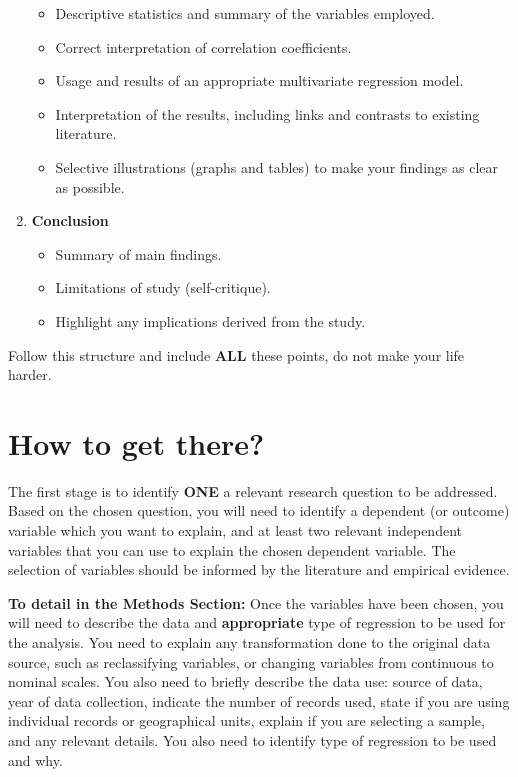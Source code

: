 \documentclass[
  letterpaper,
  DIV=11,
  numbers=noendperiod]{scrreprt}
\providecommand{\tightlist}{%
  \setlength{\itemsep}{0pt}\setlength{\parskip}{0pt}}\usepackage{longtable,booktabs,array}
\begin{document}
\begin{enumerate}
  \begin{itemize}
  \tightlist
  \item
    Descriptive statistics and summary of the variables employed.
  \item
    Correct interpretation of correlation coefficients.
  \item
    Usage and results of an appropriate multivariate regression model.
  \item
    Interpretation of the results, including links and contrasts to
    existing literature.
  \item
    Selective illustrations (graphs and tables) to make your findings as
    clear as possible.
  \end{itemize}
\item
  \textbf{Conclusion}

  \begin{itemize}
  \tightlist
  \item
    Summary of main findings.
  \item
    Limitations of study (self-critique).
  \item
    Highlight any implications derived from the study.
  \end{itemize}
\end{enumerate}

Follow this structure and include \textbf{ALL} these points, do not make
your life harder.

\section*{How to get there?}\label{how-to-get-there}


The first stage is to identify \textbf{ONE} a relevant research question
to be addressed. Based on the chosen question, you will need to identify
a dependent (or outcome) variable which you want to explain, and at
least two relevant independent variables that you can use to explain the
chosen dependent variable. The selection of variables should be informed
by the literature and empirical evidence.

\textbf{To detail in the Methods Section:} Once the variables have been
chosen, you will need to describe the data and \textbf{appropriate} type
of regression to be used for the analysis. You need to explain any
transformation done to the original data source, such as reclassifying
variables, or changing variables from continuous to nominal scales. You
also need to briefly describe the data use: source of data, year of data
collection, indicate the number of records used, state if you are using
individual records or geographical units, explain if you are selecting a
sample, and any relevant details. You also need to identify type of
regression to be used and why.
\end{document}
